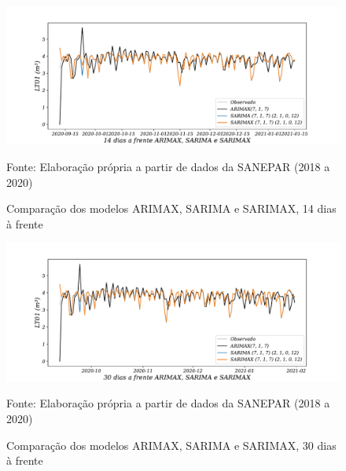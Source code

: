 \begin{figure}[H]
	\centering
	\caption{Comparação dos modelos ARIMAX, SARIMA e SARIMAX, 14 dias à frente }
	\label{fig:30-ARIMAX-SARIMA-SARIMAX24}
	\includegraphics[width=1\linewidth]{Apendices/Figuras/modelagem-24h/14-ARIMAX-SARIMA-SARIMAX}
	
Fonte: Elaboração própria a partir de dados da SANEPAR (2018 a 2020)
\end{figure}

\begin{figure}[H]
	\centering
	\caption{Comparação dos modelos ARIMAX, SARIMA e SARIMAX, 30 dias à frente }
	\label{fig:60-ARIMAX-SARIMA-SARIMAX24}
	\includegraphics[width=1\linewidth]{Apendices/Figuras/modelagem-24h/30-ARIMAX-SARIMA-SARIMAX}
	
Fonte: Elaboração própria a partir de dados da SANEPAR (2018 a 2020)
\end{figure}